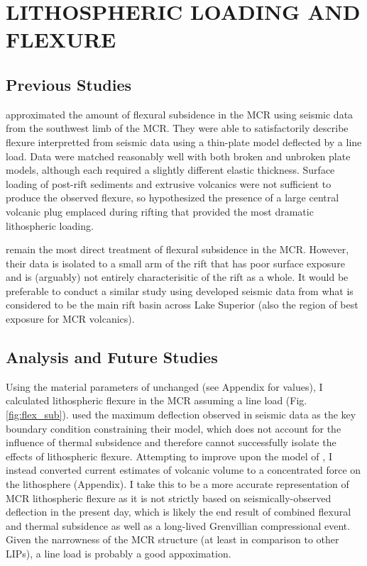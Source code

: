 \documentclass[12pt,letterpaper]{article}
\begin{document}

\section{LITHOSPHERIC LOADING AND FLEXURE}
\subsection{Previous Studies}
\cite{Nyquist1988a} approximated the amount of flexural subsidence in the MCR using seismic data from the southwest limb of the MCR. They were able to satisfactorily describe flexure interpretted from seismic data using a thin-plate model deflected by a line load. Data were matched reasonably well with both broken and unbroken plate models, although each required a slightly different elastic thickness. Surface loading of post-rift sediments and extrusive volcanics were not sufficient to produce the observed flexure, so \cite{Nyquist1988a} hypothesized the presence of a large central volcanic plug emplaced during rifting that provided the most dramatic lithospheric loading.\par

\cite{Nyquist1988a} remain the most direct treatment of flexural subsidence in the MCR. However, their data is isolated to a small arm of the rift that has poor surface exposure and is (arguably) not entirely characterisitic of the rift as a whole. It would be preferable to conduct a similar study using developed seismic data \citep{Behrendt1990a} from what is considered to be the main rift basin across Lake Superior (also the region of best exposure for MCR volcanics).\par

\subsection{Analysis and Future Studies}

Using the material parameters of \cite{Nyquist1988a} unchanged (see Appendix for values), I calculated lithospheric flexure in the MCR assuming a line load (Fig. \ref{fig:flex_sub}). \cite{Nyquist1988a} used the maximum deflection observed in seismic data as the key boundary condition constraining their model, which does not account for the influence of thermal subsidence and therefore cannot successfully isolate the effects of lithospheric flexure. Attempting to improve upon the model of \cite{Nyquist1988a}, I instead converted current estimates of volcanic volume to a concentrated force on the lithosphere (Appendix). I take this to be a more accurate representation of MCR lithospheric flexure as it is not strictly based on seismically-observed deflection in the present day, which is likely the end result of combined flexural and thermal subsidence as well as a long-lived Grenvillian compressional event. Given the narrowness of the MCR structure (at least in comparison to other LIPs), a line load is probably a good appoximation. 
\end{document}

